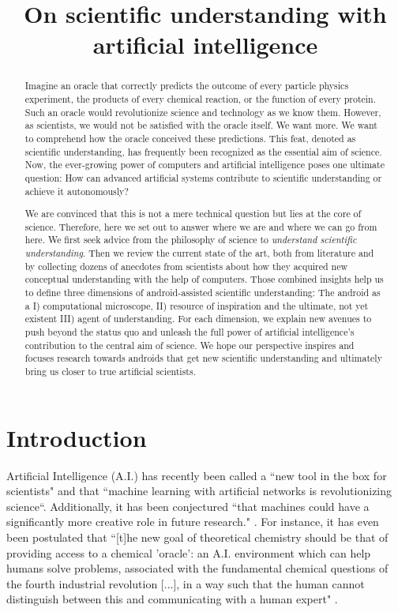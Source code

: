 
\title{On scientific understanding with artificial intelligence}

\begin{abstract}
Imagine an oracle that correctly predicts the outcome of every particle physics experiment, the products of every chemical reaction, or the function of every protein. Such an oracle would revolutionize science and technology as we know them. However, as scientists, we would not be satisfied with the oracle itself. We want more. We want to comprehend how the oracle conceived these predictions. This feat, denoted as scientific understanding, has frequently been recognized as the essential aim of science. Now, the ever-growing power of computers and artificial intelligence poses one ultimate question: How can advanced artificial systems contribute to scientific understanding or achieve it autonomously?

We are convinced that this is not a mere technical question but lies at the core of science. Therefore, here we set out to answer where we are and where we can go from here. We first seek advice from the philosophy of science to \textit{understand scientific understanding}. Then we review the current state of the art, both from literature and by collecting dozens of anecdotes from scientists about how they acquired new conceptual understanding with the help of computers. Those combined insights help us to define three dimensions of android-assisted scientific understanding: The android as a I) computational microscope, II) resource of inspiration and the ultimate, not yet existent III) agent of understanding. For each dimension, we explain new avenues to push beyond the status quo and unleash the full power of artificial intelligence's contribution to the central aim of science. We hope our perspective inspires and focuses research towards androids that get new scientific understanding and ultimately bring us closer to true artificial scientists.
\end{abstract}


\section{Introduction}
Artificial Intelligence (A.I.) has recently been called a ``new tool in the box for scientists"\cite{zdeborova2017new} and that ``machine learning with artificial networks is revolutionizing science``\cite{fosel2018reinforcement}. Additionally, it has been conjectured ``that machines could have a significantly more creative role in future research." \cite{melnikov2018active}. For instance, it has even been postulated that ``[t]he new goal of theoretical chemistry should be that of providing access to a chemical 'oracle': an A.I. environment which can help humans solve problems, associated with the fundamental chemical questions of the fourth industrial revolution [...], in a way such that the human cannot distinguish between this and communicating with a human expert" \cite{aspuru2018matter}.

